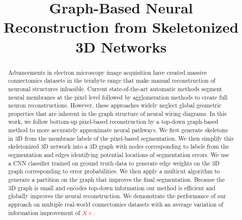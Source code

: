 \documentclass[10pt,twocolumn,letterpaper]{article}
\newcommand{\FIX}[1]{\textcolor{red}{#1}}
\begin{document}
\title{Graph-Based Neural Reconstruction from Skeletonized 3D Networks}


\maketitle
%

\begin{abstract}
Advancements in electron microscopy image acquisition have created massive connectomics datasets in the terabyte range that make manual reconstruction of neuronal structures infeasible.
Current state-of-the-art automatic methods segment neural membranes at the pixel level followed by agglomeration methods to create full neuron reconstructions.
However, these approaches widely neglect global geometric properties that are inherent in the graph structure of neural wiring diagrams.
In this work, we follow bottom-up pixel-based reconstruction by a top-down graph-based method to more accurately approximate neural pathways.
We first generate skeletons in 3D from the membrane labels of the pixel-based segmentation.
We then simplify this skeletonized 3D network into a 3D graph with nodes corresponding to labels from the segmentation and edges identifying potential locations of segmentation errors.
We use a CNN classifier trained on ground truth data to generate edge weights on the 3D graph corresponding to error probabilities.
We then apply a multicut algorithm to generate a partition on the graph that improves the final segmentation.
Because the 3D graph is small and encodes top-down information our method is efficient and globally improves the neural reconstruction.
We demonstrate the performance of our approach on multiple real-world connectomics datasets with an average variation of information improvement of \FIX{$X\times$}.
\end{abstract}














{\small

}
\end{document}
